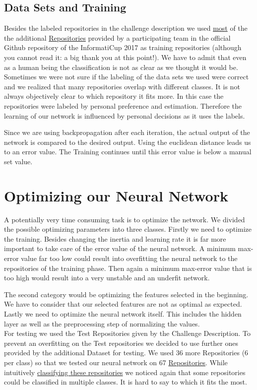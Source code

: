\documentclass[paper=A4,pagesize=auto,12pt,headinclude=true,footinclude=true,BCOR=0mm,DIV=calc]{scrartcl}
\begin{document}
	
	
	
	
	\subsection{Data Sets and Training}
	Besides the labeled repositories in the challenge description we used \hyperref[src:TrainingRepositories]{most} of the the additional \hyperref[src:Repositories]{Repositories} provided by a participating team in the official Github repository of the InformatiCup 2017 as training repositories (although you cannot read it: a big thank you at this point!). We have to admit that even as a human being the classification is not as clear as we thought it would be. Sometimes we were not sure if the labeling of the data sets we used were correct and we realized that many repositories overlap with different classes. It is not always objectively clear to which repository it fits more. In this case the repositories were labeled by personal preference and estimation. Therefore the learning of our network is influenced by personal decisions as it uses the labels.
	
	Since we are using backpropagation after each iteration, the actual output of the network is compared to the desired output. Using the euclidean distance leads us to an error value. The Training continues until this error value is below a manual set value.
	
	
	
	\section{Optimizing our Neural Network }
	\label{src:optimizing}
	A potentially very time consuming task is to optimize the network. We divided the possible optimizing parameters into three classes. Firstly we need to optimize the training. Besides changing the inertia and learning rate it is far more important to take care of the error value of the neural network. A minimum max-error value far too low could result into overfitting the neural network to the repositories of the training phase. Then again a minimum max-error value that is too high would result into a very unstable and an underfit network. 
	
	The second category would be optimizing the features selected in the beginning. We have to consider that our selected features are not as optimal as expected.
	Lastly we need to optimize the neural network itself. This includes the hidden layer as well as the preprocessing step of normalizing the values.\\
	For testing we used the Test Repositories given by the Challenge Description. To prevent an overfitting on the Test repositories we decided to use further ones provided by the additional Dataset for testing. We used 36 more Repositories (6 per class) so that we tested our neural network on 67 \hyperref[src:TestRepositories]{Repositories}. While intuitively \hyperref[src:ClassifyTestRepositories]{classifying these repositories} we noticed again that some repositories could be classified in multiple classes. It is hard to say to which it fits the most. 
	
\end{document}
